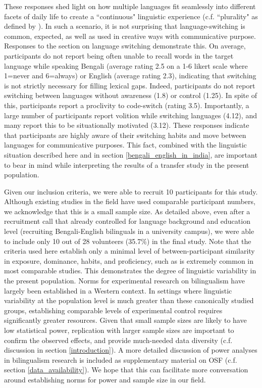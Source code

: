 \documentclass[12 pt]{article}
\begin{document}
These responses shed light on how multiple languages fit seamlessly into different facets of daily life to create a ``continuous" linguistic experience (c.f. ``plurality" as defined by \cite{khubchandani2021plural}). In such a scenario, it is not surprising that language-switching is common, expected, as well as used in creative ways with communicative purpose. Responses to the section on language switching demonstrate this. On average, participants do not report being often unable to recall words in the target language while speaking Bengali (average rating 2.5 on a 1-6 likert scale where 1=never and 6=always) or English (average rating 2.3), indicating that switching is not strictly necessary for filling lexical gaps. Indeed, participants do not report switching between languages without awareness (1.8) or control (1.25). In spite of this, participants report a proclivity to code-switch (rating 3.5). Importantly, a large number of participants report volition while switching languages (4.12), and many report this to be situationally motivated (3.12). These responses indicate that participants are highly aware of their switching habits and move between languages for communicative purposes. This fact, combined with the linguistic situation described here and in section \ref{bengali_english_in_india}, are important to bear in mind while interpreting the results of a transfer study in the present population. 

Given our inclusion criteria, we were able to recruit 10 participants for this study. Although existing studies in the field have used comparable participant numbers, we acknowledge that this is a small sample size. As detailed above, even after a recruitment call that already controlled for language background and education level (recruiting Bengali-English bilinguals in a university campus), we were able to include only 10 out of 28 volunteers (35.7\%) in the final study. Note that the criteria used here establish only a minimal level of between-participant similarity in exposure, dominance, habits, and proficiency, such as is extremely common in most comparable studies. This demonstrates the degree of linguistic variability in the present population. Norms for experimental research on bilingualism have largely been established in a Western context. In settings where linguistic variability at the population level is much greater than these canonically studied groups, establishing comparable levels of experimental control requires significantly greater resources. Given that small sample sizes are likely to have low statistical power, replication with larger sample sizes are important to confirm the observed effects, and provide much-needed data diversity (c.f. discussion in section \ref{introduction}). A more detailed discussion of power analyses in bilingualism research is included as supplementary material on OSF (c.f. section \ref{data_availability}). We hope that this can facilitate more conversation around establishing norms for power and sample size in our field.  
\end{document}
